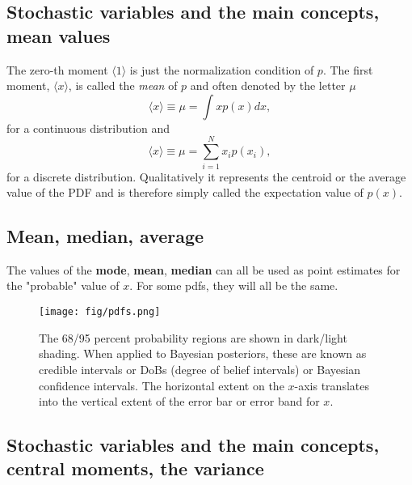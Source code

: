 \documentclass[%
oneside,                 %
final,                   %
10pt]{article}
\newenvironment{block_mdfboxadmon}[1][]{
\begin{block_mdfboxmdframed}[frametitle=#1]
}
{
\end{block_mdfboxmdframed}
}
\begin{document}
\subsection{Stochastic variables and the main concepts, mean values}

\begin{block_mdfboxadmon}[]
The zero-th moment $\langle 1\rangle$ is just the normalization condition of
$p$. The first moment, $\langle x\rangle$, is called the \emph{mean} of $p$
and often denoted by the letter $\mu$
\begin{equation*}
\langle x\rangle  \equiv \mu = \int x p(x)dx,
\end{equation*}
for a continuous distribution and 
\begin{equation*}
\langle x\rangle  \equiv \mu = \sum_{i=1}^N x_i p(x_i),
\end{equation*}
for a discrete distribution. 
Qualitatively it represents the centroid or the average value of the
PDF and is therefore simply called the expectation value of $p(x)$.
\end{block_mdfboxadmon} %



\subsection{Mean, median, average}

\begin{block_mdfboxadmon}[]
The values of the \textbf{mode}, \textbf{mean}, \textbf{median} can all be used as point estimates for the "probable" value of $x$. For some pdfs, they will all be the same.
\end{block_mdfboxadmon} %




\begin{figure}[!ht]  %
  \centerline{\texttt{[image: fig/pdfs.png]}}
  \caption{
  The 68/95 percent probability regions are shown in dark/light shading. When applied to Bayesian posteriors, these are known as credible intervals or DoBs (degree of belief intervals) or Bayesian confidence intervals. The horizontal extent on the $x$-axis translates into the vertical extent of the error bar or error band for $x$.
  }
\end{figure}


\subsection{Stochastic variables and the main concepts, central moments, the variance}
\end{document}
